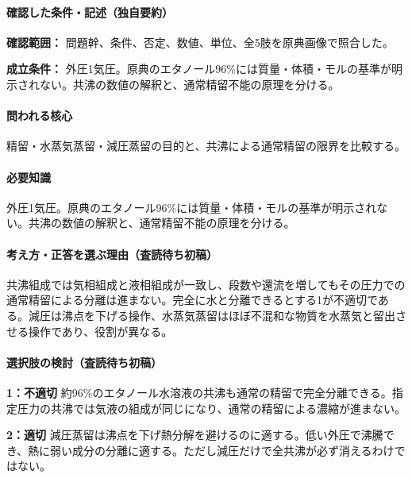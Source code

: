 \paragraph{確認した条件・記述（独自要約）}\mbox{}\par

\noindent\textbf{確認範囲：} 問題幹、条件、否定、数値、単位、全5肢を原典画像で照合した。\par

\noindent\textbf{成立条件：} 外圧1気圧。原典のエタノール96\%には質量・体積・モルの基準が明示されない。共沸の数値の解釈と、通常精留不能の原理を分ける。\par

\paragraph{問われる核心} 精留・水蒸気蒸留・減圧蒸留の目的と、共沸による通常精留の限界を比較する。

\paragraph{必要知識} 外圧1気圧。原典のエタノール96\%には質量・体積・モルの基準が明示されない。共沸の数値の解釈と、通常精留不能の原理を分ける。

\paragraph{考え方・正答を選ぶ理由（査読待ち初稿）} 共沸組成では気相組成と液相組成が一致し、段数や還流を増してもその圧力での通常精留による分離は進まない。完全に水と分離できるとする1が不適切である。減圧は沸点を下げる操作、水蒸気蒸留はほぼ不混和な物質を水蒸気と留出させる操作であり、役割が異なる。

\paragraph{選択肢の検討（査読待ち初稿）}\mbox{}\par

\noindent\textbf{1：不適切} 約96\%のエタノール水溶液の共沸も通常の精留で完全分離できる。指定圧力の共沸では気液の組成が同じになり、通常の精留による濃縮が進まない。\par

\noindent\textbf{2：適切} 減圧蒸留は沸点を下げ熱分解を避けるのに適する。低い外圧で沸騰でき、熱に弱い成分の分離に適する。ただし減圧だけで全共沸が必ず消えるわけではない。\par

